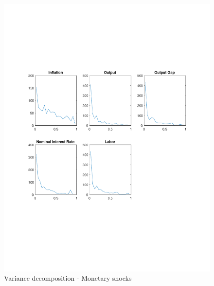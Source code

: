 \documentclass[12pt]{article}
\theoremstyle{definition}
\begin{document}
\begin{figure}[H]
	\centering
	\includegraphics[width=\linewidth, height = 0.4\textheight]{var_monetary}
	\caption{Variance decomposition - Monetary shocks}
	\label{fig:var_monetary}
\end{figure}
\end{document}
